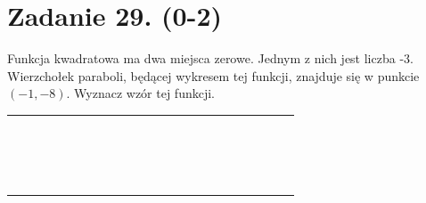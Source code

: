 \documentclass[10pt]{article}
\begin{document}
\section*{Zadanie 29. (0-2)}
Funkcja kwadratowa ma dwa miejsca zerowe. Jednym z nich jest liczba -3. Wierzchołek paraboli, będącej wykresem tej funkcji, znajduje się w punkcie \((-1,-8)\). Wyznacz wzór tej funkcji.

\begin{center}
\begin{tabular}{|c|c|c|c|c|c|c|c|c|c|c|c|c|c|c|c|c|c|c|c|c|c|c|}
\hline
 &  &  &  &  &  &  &  &  &  &  &  &  &  &  &  &  &  &  &  &  &  &  \\
\hline
 &  &  &  &  &  &  &  &  &  &  &  &  &  &  &  &  &  &  &  &  &  &  \\
\hline
 &  &  &  &  &  &  &  &  &  &  &  &  &  &  &  &  &  &  &  &  &  &  \\
\hline
 &  &  &  &  &  &  &  &  &  &  &  &  &  &  &  &  &  &  &  &  &  &  \\
\hline
 &  &  &  &  &  &  &  &  &  &  &  &  &  &  &  &  &  &  &  &  &  &  \\
\hline
 &  &  &  &  &  &  &  &  &  &  &  &  &  &  &  &  &  &  &  &  &  &  \\
\hline
 &  &  &  &  &  &  &  &  &  &  &  &  &  &  &  &  &  &  &  &  &  &  \\
\hline
 &  &  &  &  &  &  &  &  &  &  &  &  &  &  &  &  &  &  &  &  &  &  \\
\hline
 &  &  &  &  &  &  &  &  &  &  &  &  &  &  &  &  &  &  &  &  &  &  \\
\hline
 &  &  &  &  &  &  &  &  &  &  &  &  &  &  &  &  &  &  &  &  &  &  \\
\hline
 &  &  &  &  &  &  &  &  &  &  &  &  &  &  &  &  &  &  &  &  &  &  \\
\hline
 &  &  &  &  &  &  &  &  &  &  &  &  &  &  &  &  &  &  &  &  &  &  \\
\hline
 &  &  &  &  &  &  &  &  &  &  &  &  &  &  &  &  &  &  &  &  &  &  \\
\hline
 &  &  &  &  &  &  &  &  &  &  &  &  &  &  &  &  &  &  &  &  &  &  \\
\hline
 &  &  &  &  &  &  &  &  &  &  &  &  &  &  &  &  &  &  &  &  &  &  \\
\hline
 &  &  &  &  &  &  &  &  &  &  &  &  &  &  &  &  &  &  &  &  &  &  \\
\hline
 &  &  &  &  &  &  &  &  &  &  &  &  &  &  &  &  &  &  &  &  &  &  \\
\hline
 &  &  &  &  &  &  &  &  &  &  &  &  &  &  &  &  &  &  &  &  &  &  \\

\end{tabular}
\end{center}
\end{document}

